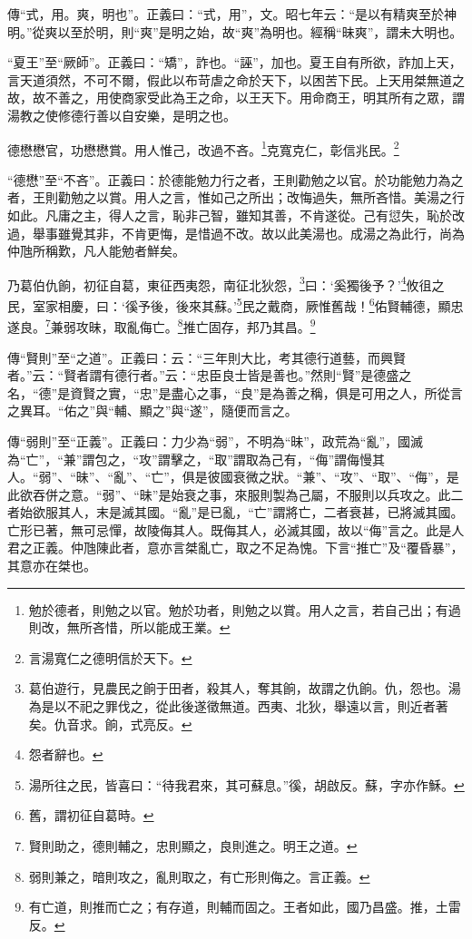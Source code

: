 {\noindent\zhuan{}\fzbyks 傳“式，用。爽，明也”。正義曰：“式，用”，文。昭七年云：“是以有精爽至於神明。”從爽以至於明，則“爽”是明之始，故“爽”為明也。經稱“昧爽”，謂未大明也。 \par}

{\noindent\shu{}\fzkt “夏王”至“厥師”。正義曰：“矯”，詐也。“誣”，加也。夏王自有所欲，詐加上天，言天道須然，不可不爾，假此以布苛虐之命於天下，以困苦下民。上天用桀無道之故，故不善之，用使商家受此為王之命，以王天下。用命商王，明其所有之眾，謂湯教之使修德行善以自安樂，是明之也。 \par}

德懋懋官，功懋懋賞。用人惟己，改過不吝。\footnote{勉於德者，則勉之以官。勉於功者，則勉之以賞。用人之言，若自己出；有過則改，無所吝惜，所以能成王業。}克寬克仁，彰信兆民。\footnote{言湯寬仁之德明信於天下。}

{\noindent\shu{}\fzkt “德懋”至“不吝”。正義曰：於德能勉力行之者，王則勸勉之以官。於功能勉力為之者，王則勸勉之以賞。用人之言，惟如己之所出；改悔過失，無所吝惜。美湯之行如此。凡庸之主，得人之言，恥非己智，雖知其善，不肯遂從。己有愆失，恥於改過，舉事雖覺其非，不肯更悔，是惜過不改。故以此美湯也。成湯之為此行，尚為仲虺所稱歎，凡人能勉者鮮矣。 \par}

乃葛伯仇餉，初征自葛，東征西夷怨，南征北狄怨，\footnote{葛伯遊行，見農民之餉于田者，殺其人，奪其餉，故謂之仇餉。仇，怨也。湯為是以不祀之罪伐之，從此後遂徵無道。西夷、北狄，舉遠以言，則近者著矣。仇音求。餉，式亮反。}曰：‘奚獨後予？’\footnote{怨者辭也。}攸徂之民，室家相慶，曰：‘徯予後，後來其蘇。’\footnote{湯所往之民，皆喜曰：“待我君來，其可蘇息。”徯，胡啟反。蘇，字亦作穌。}民之戴商，厥惟舊哉！\footnote{舊，謂初征自葛時。}佑賢輔德，顯忠遂良。\footnote{賢則助之，德則輔之，忠則顯之，良則進之。明王之道。}兼弱攻昧，取亂侮亡。\footnote{弱則兼之，暗則攻之，亂則取之，有亡形則侮之。言正義。}推亡固存，邦乃其昌。\footnote{有亡道，則推而亡之；有存道，則輔而固之。王者如此，國乃昌盛。推，土雷反。}

{\noindent\zhuan{}\fzbyks 傳“賢則”至“之道”。正義曰：云：“三年則大比，考其德行道藝，而興賢者。”云：“賢者謂有德行者。”云：“忠臣良士皆是善也。”然則“賢”是德盛之名，“德”是資賢之實，“忠”是盡心之事，“良”是為善之稱，俱是可用之人，所從言之異耳。“佑之”與“輔、顯之”與“遂”，隨便而言之。 \par}

{\noindent\zhuan{}\fzbyks 傳“弱則”至“正義”。正義曰：力少為“弱”，不明為“昧”，政荒為“亂”，國滅為“亡”，“兼”謂包之，“攻”謂擊之，“取”謂取為己有，“侮”謂侮慢其人。“弱”、“昧”、“亂”、“亡”，俱是彼國衰微之狀。“兼”、“攻”、“取”、“侮”，是此欲吞併之意。“弱”、“昧”是始衰之事，來服則製為己屬，不服則以兵攻之。此二者始欲服其人，末是滅其國。“亂”是已亂，“亡”謂將亡，二者衰甚，已將滅其國。亡形已著，無可忌憚，故陵侮其人。既侮其人，必滅其國，故以“侮”言之。此是人君之正義。仲虺陳此者，意亦言桀亂亡，取之不足為愧。下言“推亡”及“覆昏暴”，其意亦在桀也。 \par}

